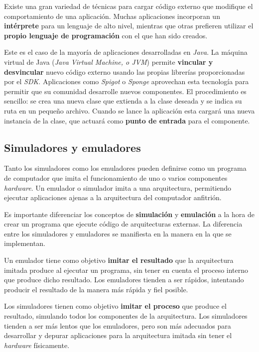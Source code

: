 Existe una gran variedad de técnicas para cargar código externo
que modifique el comportamiento de una aplicación.
Muchas aplicaciones incorporan un \textbf{intérprete} para un
lenguaje de alto nivel, mientras que otras prefieren utilizar
el \textbf{propio lenguaje de programación} con el que han sido creados.

Este es el caso de la mayoría de aplicaciones desarrolladas
en \textit{Java}\cite{JAVA_PLUGINS}.
La máquina virtual de Java (\textit{Java Virtual Machine, o JVM}) permite \textbf{vincular y desvincular} nuevo código externo
usando las propias librerías proporcionadas por el \textit{SDK}.
Aplicaciones como \textit{Spigot}\cite{SPIGOT} o \textit{Sponge}\cite{SPONGE} aprovechan esta
tecnología para permitir que su comunidad desarrolle nuevos
componentes.
El procedimiento es sencillo: se crea una nueva clase que extienda a la
clase deseada y se indica su ruta en un pequeño archivo.
Cuando se lance la aplicación esta cargará una nueva instancia
de la clase, que actuará como \textbf{punto de entrada} para el componente.

\subsection{Simuladores y emuladores}
\label{subsec:simuladores-y-emuladores}

Tanto los simuladores como los emuladores pueden definirse como un
programa de computador que imita el funcionamiento de uno o varios
componentes \textit{hardware}.
Un emulador o simulador imita a una arquitectura, permitiendo
ejecutar aplicaciones ajenas a la arquitectura del computador anfitrión.

Es importante diferenciar los conceptos de \textbf{simulación}
y \textbf{emulación} a la hora de crear un programa que ejecute
código de arquitecturas externas.
La diferencia entre los simuladores y emuladores se manifiesta
en la manera en la que se implementan.

Un emulador tiene como objetivo \textbf{imitar el resultado}
que la arquitectura imitada produce al ejecutar un programa, sin tener
en cuenta el proceso interno que produce dicho resultado.
Los emuladores tienden a ser rápidos, intentando producir el resultado
de la manera más rápida y fiel posible.

Los simuladores tienen como objetivo \textbf{imitar el proceso}
que produce el resultado, simulando todos los componentes de la arquitectura.
Los simuladores tienden a ser más lentos que los emuladores, pero son más
adecuados para desarrollar y depurar aplicaciones para la arquitectura
imitada sin tener el \textit{hardware} físicamente.

